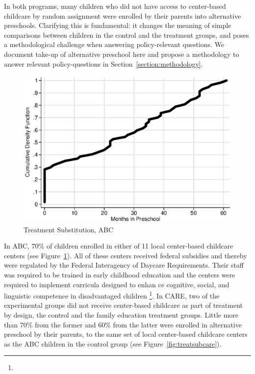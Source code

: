 \noindent In both programs, many children who did not have access to center-based childcare by random assignment were enrolled by their parents into alternative preschools. Clarifying this is fundamental: it changes the meaning of simple comparisons between children in the control and the treatment groups, and poses a methodological challenge when answering policy-relevant questions. We document take-up of alternative preschool here and propose a methodology to answer relevant policy-questions in Section~\ref{section:methodology}.\\

\begin{figure}[H]
		\caption{Treatment Substitution, ABC} \label{fig:treatsubabc}
		\includegraphics[width=.9\columnwidth]{output/abc_controlcontamination_months.eps}
\end{figure}

\noindent In ABC, $70\%$ of children enrolled in either of 11 local center-based childcare centers (see Figure~\ref{fig:treatsubabc}). All of these centers received federal subsidies and thereby were regulated by the Federal Interagency of Daycare Requirements. Their staff was required to be trained in early childhood education and the centers were required to implement curricula designed to enhan ce cognitive, social, and linguistic competence in disadvantaged children \footnote{}. In CARE, two of the experimental groups did not receive center-based childcare as part of treatment by design, the control and the family education treatment groups. Little more than $70\%$ from the  former and $60\%$ from the latter were enrolled in alternative preschool by their parents, to the same set of local center-based childcare centers as the ABC children in the control group (see Figure~\ref{fig:treatsubcare}).\\

